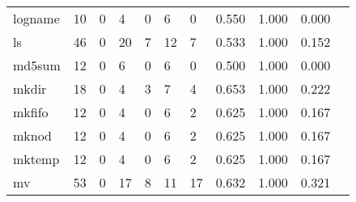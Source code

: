 \begin{longtable}{lp{1.10cm}p{1.10cm}p{1.10cm}p{1.10cm}p{1.10cm}p{1.10cm}p{1.10cm}p{1.10cm}p{1.10cm}p{1.10cm}}
logname   &                     10 &                                  0 &                                 4 &                                0 &                                 6 &                               0 &                          0.550 &                                 1.000 &                               0.000 \\
ls        &                     46 &                                  0 &                                20 &                                7 &                                12 &                               7 &                          0.533 &                                 1.000 &                               0.152 \\
md5sum    &                     12 &                                  0 &                                 6 &                                0 &                                 6 &                               0 &                          0.500 &                                 1.000 &                               0.000 \\
mkdir     &                     18 &                                  0 &                                 4 &                                3 &                                 7 &                               4 &                          0.653 &                                 1.000 &                               0.222 \\
mkfifo    &                     12 &                                  0 &                                 4 &                                0 &                                 6 &                               2 &                          0.625 &                                 1.000 &                               0.167 \\
mknod     &                     12 &                                  0 &                                 4 &                                0 &                                 6 &                               2 &                          0.625 &                                 1.000 &                               0.167 \\
mktemp    &                     12 &                                  0 &                                 4 &                                0 &                                 6 &                               2 &                          0.625 &                                 1.000 &                               0.167 \\
mv        &                     53 &                                  0 &                                17 &                                8 &                                11 &                              17 &                          0.632 &                                 1.000 &                               0.321 \\

\end{longtable}
